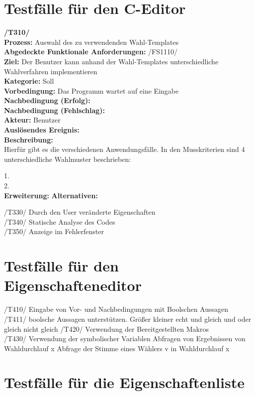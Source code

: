 \documentclass[a4paper]{scrreprt}
\begin{document}
\section{Testfälle für den C-Editor}
\textbf{/T310/} \\
\textbf{Prozess: }Auswahl des zu verwendenden Wahl-Templates \\
\textbf{Abgedeckte Funktionale Anforderungen:} /FS1110/ \\
\textbf{Ziel:} Der Benutzer kann anhand der Wahl-Templates unterschiedliche Wahlverfahren implementieren\\
\textbf{Kategorie:} Soll\\
\textbf{Vorbedingung:} Das Programm wartet auf eine Eingabe\\
\textbf{Nachbedingung (Erfolg):} \\
\textbf{Nachbedingung (Fehlschlag):} \\
\textbf{Akteur:} Benutzer\\
\textbf{Auslösendes Ereignis:} \\
\textbf{Beschreibung:} \\
Hierfür gibt es die verschiedenen Anwendungsfälle. In den Musskriterien sind 4 unterschiedliche Wahlmuster beschrieben:

1. \\
2. \\
\textbf {Erweiterung:}
\textbf {Alternativen:}

/T330/ Durch den User veränderte Eigenschaften \\
/T340/ Statische Analyse des Codes \\
/T350/ Anzeige im Fehlerfenster
\section{Testfälle für den Eigenschafteneditor}

/T410/ Eingabe von Vor- und Nachbedingungen mit Boolschen Aussagen\\
/T411/ boolsche Aussagen unterstützen. Größer kleiner echt und gleich
und oder gleich nicht gleich
/T420/ Verwendung der Bereitgestellten Makros \\
/T430/ Verwendung der symbolischer Variablen 
Abfragen von Ergebnissen von Wahldurchlauf x
Abfrage der Stimme eines Wählers v in Wahldurchlauf x

\section{Testfälle für die Eigenschaftenliste}
\end{document}
